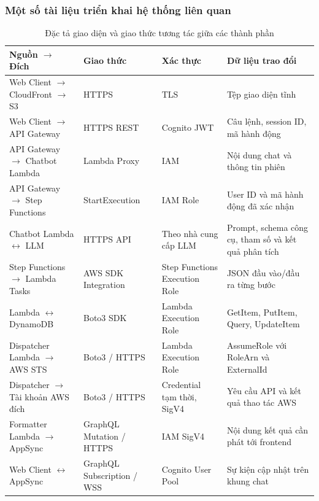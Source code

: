 \documentclass[a4paper,12pt]{article}
\begin{document}
\subsubsection{Một số tài liệu triển khai hệ thống liên quan}
\begin{table}[H]
\centering
\caption{Đặc tả giao diện và giao thức tương tác giữa các thành phần}
\label{tab:inter_service_interfaces}
\begingroup
\renewcommand{\arraystretch}{1.12}
\fontsize{8.5}{11.2}\selectfont
\begin{tabularx}{\linewidth}{@{}>{\raggedright\arraybackslash}p{4.1cm}>{\raggedright\arraybackslash}p{2.35cm}>{\raggedright\arraybackslash}p{3.05cm}Y@{}}
\toprule
\textbf{Nguồn $\rightarrow$ Đích} & \textbf{Giao thức} & \textbf{Xác thực} & \textbf{Dữ liệu trao đổi}\\
\midrule
Web Client $\rightarrow$ CloudFront $\rightarrow$ S3 & HTTPS & TLS & Tệp giao diện tĩnh\\
Web Client $\rightarrow$ API Gateway & HTTPS REST & Cognito JWT & Câu lệnh, session ID, mã hành động\\
API Gateway $\rightarrow$ Chatbot Lambda & Lambda Proxy & IAM & Nội dung chat và thông tin phiên\\
API Gateway $\rightarrow$ Step Functions & StartExecution & IAM Role & User ID và mã hành động đã xác nhận\\
Chatbot Lambda $\leftrightarrow$ LLM & HTTPS API & Theo nhà cung cấp LLM & Prompt, schema công cụ, tham số và kết quả phân tích\\
Step Functions $\rightarrow$ Lambda Tasks & AWS SDK Integration & Step Functions Execution Role & JSON đầu vào/đầu ra từng bước\\
Lambda $\leftrightarrow$ DynamoDB & Boto3 SDK & Lambda Execution Role & GetItem, PutItem, Query, UpdateItem\\
Dispatcher Lambda $\rightarrow$ AWS STS & Boto3 / HTTPS & Lambda Execution Role & AssumeRole với RoleArn và ExternalId\\
Dispatcher $\rightarrow$ Tài khoản AWS đích & Boto3 / HTTPS & Credential tạm thời, SigV4 & Yêu cầu API và kết quả thao tác AWS\\
Formatter Lambda $\rightarrow$ AppSync & GraphQL Mutation / HTTPS & IAM SigV4 & Nội dung kết quả cần phát tới frontend\\
Web Client $\leftrightarrow$ AppSync & GraphQL Subscription / WSS & Cognito User Pool & Sự kiện cập nhật trên khung chat\\
\bottomrule
\end{tabularx}
\endgroup
\end{table}
\end{document}
